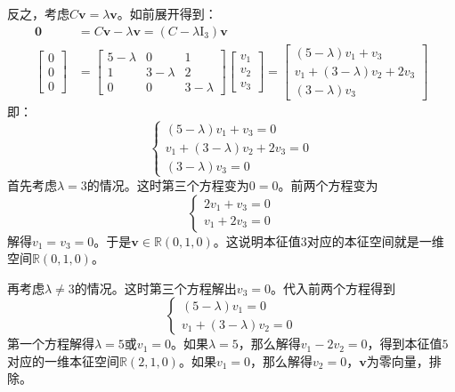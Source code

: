 \documentclass[12pt,UTF8]{ctexbook}
\begin{document}
反之，考虑$C\mathbf{v} = \lambda \mathbf{v}$。如前展开得到：
\begin{align*}
    \mathbf{0} &= C\mathbf{v} - \lambda\mathbf{v} = (C - \lambda \mathrm{I}_3)\mathbf{v} \\
    \begin{bmatrix} 0 \\ 0 \\ 0 \end{bmatrix} &=  \begin{bmatrix} 5- \lambda & 0 & 1 \\ 1 & 3- \lambda & 2 \\ 0 & 0 & 3- \lambda \end{bmatrix} \begin{bmatrix}
       v_1\\ v_2 \\ v_3
    \end{bmatrix} =  \begin{bmatrix}
       (5 - \lambda)v_1 +v_3 \\ v_1 + (3 - \lambda)v_2 + 2v_3 \\ (3 - \lambda)v_3
    \end{bmatrix}
\end{align*}
即：
$$
\left\{
    \begin{aligned}
        (5 - \lambda)v_1 + v_3 = 0 \\
        v_1 + (3 - \lambda)v_2 + 2v_3 = 0 \\
        (3 - \lambda)v_3 = 0
    \end{aligned}
\right.
$$
首先考虑$\lambda = 3$的情况。这时第三个方程变为$0 = 0$。前两个方程变为
$$
\left\{
    \begin{aligned}
        2v_1 + v_3 = 0 \\
        v_1  + 2v_3 = 0 
    \end{aligned}
\right.
$$
解得$v_1 = v_3 = 0$。于是$\mathbf{v} \in \mathbb{R}(0,1,0)$。这说明本征值$3$对应的本征空间就是一维空间$\mathbb{R}(0,1,0)$。

再考虑$\lambda\neq 3$的情况。这时第三个方程解出$v_3 = 0$。代入前两个方程得到
$$
\left\{
    \begin{aligned}
        (5 - \lambda)v_1 = 0 \\
        v_1 + (3 - \lambda)v_2 = 0 
    \end{aligned}
\right.
$$
第一个方程解得$\lambda = 5$或$v_1 = 0$。如果$\lambda = 5$，那么解得$v_1 -2 v_2=0 $，得到本征值$5$对应的一维本征空间$\mathbb{R}(2,1,0)$。如果$v_1 = 0$，那么解得$v_2 = 0$，$\mathbf{v}$为零向量，排除。
\end{document}
